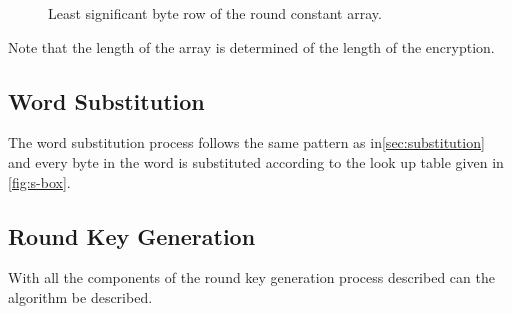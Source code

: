 \documentclass[report.tex]{subfiles}
\begin{document}
\begin{figure}[ht]
\setlength{\unitlength}{1.0cm}
	\begin{center}
	\end{center}
	\caption{Least significant byte row of the round constant array.}
	\label{fig:round constant array}
\end{figure}
Note that the length of the array is determined of the length of the encryption.

\subsection{Word Substitution}
	The word substitution process follows the same pattern as in\ref{sec:substitution} and every byte in the word is substituted according to the look up table given in \ref{fig:s-box}.
	
\subsection{Round Key Generation}
	With all the components of the round key generation process described can the algorithm be described.
\end{document}
